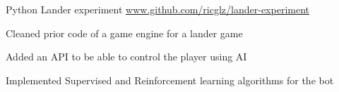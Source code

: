 \begin{cventries}
  \cventry
    {Python}
    {Lander experiment}
    {}
    {\url{www.github.com/ricglz/lander-experiment}}
    {
      \begin{cvitems}
        \item {Cleaned prior code of a game engine for a lander game}
        \item {Added an API to be able to control the player using AI}
        \item {Implemented Supervised and Reinforcement learning algorithms for the bot}
      \end{cvitems}
    }


\end{cventries}
